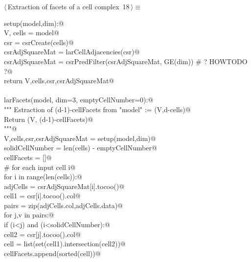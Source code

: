 \documentclass[11pt,oneside]{article}	%
\begin{document}
\begin{flushleft} \small \label{scrap28}
\protect{}$\langle\,$Extraction of facets of a cell complex\nobreak\ {\footnotesize 18}$\,\rangle\equiv$
\vspace{-1ex}
\begin{list}{}{} \item
\mbox{}\verb@def setup(model,dim):@\\
\mbox{}\verb@   V, cells = model@\\
\mbox{}\verb@   csr = csrCreate(cells)@\\
\mbox{}\verb@   csrAdjSquareMat = larCellAdjacencies(csr)@\\
\mbox{}\verb@   csrAdjSquareMat = csrPredFilter(csrAdjSquareMat, GE(dim)) # ? HOWTODO ?@\\
\mbox{}\verb@   return V,cells,csr,csrAdjSquareMat@\\
\mbox{}\verb@@\\
\mbox{}\verb@def larFacets(model, dim=3, emptyCellNumber=0):@\\
\mbox{}\verb@   """ Estraction of (d-1)-cellFacets from "model" := (V,d-cells)@\\
\mbox{}\verb@      Return (V, (d-1)-cellFacets)@\\
\mbox{}\verb@      """@\\
\mbox{}\verb@   V,cells,csr,csrAdjSquareMat = setup(model,dim)@\\
\mbox{}\verb@   solidCellNumber = len(cells) - emptyCellNumber@\\
\mbox{}\verb@   cellFacets = []@\\
\mbox{}\verb@   # for each input cell i@\\
\mbox{}\verb@   for i in range(len(cells)):@\\
\mbox{}\verb@      adjCells = csrAdjSquareMat[i].tocoo()@\\
\mbox{}\verb@      cell1 = csr[i].tocoo().col@\\
\mbox{}\verb@      pairs = zip(adjCells.col,adjCells.data)@\\
\mbox{}\verb@      for j,v in pairs:@\\
\mbox{}\verb@         if (i<j) and (i<solidCellNumber):@\\
\mbox{}\verb@            cell2 = csr[j].tocoo().col@\\
\mbox{}\verb@            cell = list(set(cell1).intersection(cell2))@\\
\mbox{}\verb@            cellFacets.append(sorted(cell))@\\

\end{list}
\end{flushleft}
\end{document}
